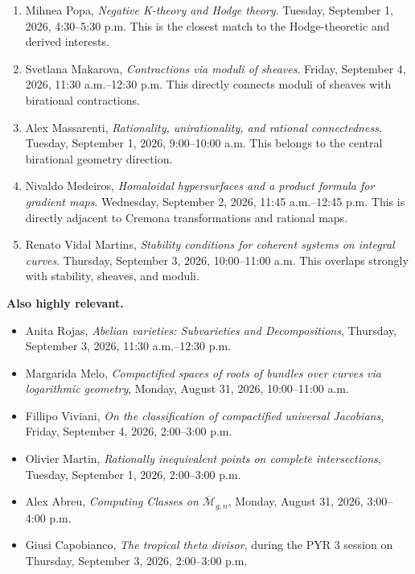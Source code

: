 \begin{enumerate}

\item Mihnea Popa,
{\it Negative K-theory and Hodge theory}.
Tuesday, September 1, 2026,
4:30--5:30 p.m.
This is the closest match to the
Hodge-theoretic and derived interests.

\item Svetlana Makarova,
{\it Contractions via moduli of sheaves}.
Friday, September 4, 2026,
11:30 a.m.--12:30 p.m.
This directly connects moduli of sheaves
with birational contractions.

\item Alex Massarenti,
{\it Rationality, unirationality, and
rational connectedness}.
Tuesday, September 1, 2026,
9:00--10:00 a.m.
This belongs to the central birational
geometry direction.

\item Nivaldo Medeiros,
{\it Homaloidal hypersurfaces and a product
formula for gradient maps}.
Wednesday, September 2, 2026,
11:45 a.m.--12:45 p.m.
This is directly adjacent to Cremona
transformations and rational maps.

\item Renato Vidal Martins,
{\it Stability conditions for coherent
systems on integral curves}.
Thursday, September 3, 2026,
10:00--11:00 a.m.
This overlaps strongly with stability,
sheaves, and moduli.

\end{enumerate}

\medskip\noindent
{\bf Also highly relevant.}

\begin{itemize}

\item Anita Rojas,
{\it Abelian varieties: Subvarieties and
Decompositions},
Thursday, September 3, 2026,
11:30 a.m.--12:30 p.m.

\item Margarida Melo,
{\it Compactified spaces of roots of
bundles over curves via logarithmic
geometry},
Monday, August 31, 2026,
10:00--11:00 a.m.

\item Fillipo Viviani,
{\it On the classification of compactified
universal Jacobians},
Friday, September 4, 2026,
2:00--3:00 p.m.

\item Olivier Martin,
{\it Rationally inequivalent points on
complete intersections},
Tuesday, September 1, 2026,
2:00--3:00 p.m.

\item Alex Abreu,
{\it Computing Classes on
$\overline{\mathcal{M}}_{g,n}$},
Monday, August 31, 2026,
3:00--4:00 p.m.

\item Giusi Capobianco,
{\it The tropical theta divisor},
during the PYR 3 session on
Thursday, September 3, 2026,
2:00--3:00 p.m.

\end{itemize}

